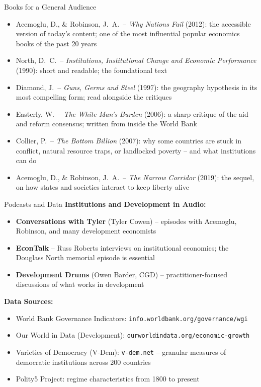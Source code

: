 \documentclass[10pt]{beamer}
\begin{document}
\begin{frame}{Books for a General Audience}
\begin{itemize}
\item Acemoglu, D., \& Robinson, J.\ A.\ -- \emph{Why Nations Fail} (2012): the accessible version of today's content; one of the most influential popular economics books of the past 20 years
\item North, D.\ C.\ -- \emph{Institutions, Institutional Change and Economic Performance} (1990): short and readable; the foundational text
\item Diamond, J.\ -- \emph{Guns, Germs and Steel} (1997): the geography hypothesis in its most compelling form; read alongside the critiques
\item Easterly, W.\ -- \emph{The White Man's Burden} (2006): a sharp critique of the aid and reform consensus; written from inside the World Bank
\item Collier, P.\ -- \emph{The Bottom Billion} (2007): why some countries are stuck in conflict, natural resource traps, or landlocked poverty -- and what institutions can do
\item Acemoglu, D., \& Robinson, J.\ A.\ -- \emph{The Narrow Corridor} (2019): the sequel, on how states and societies interact to keep liberty alive
\end{itemize}
\end{frame}


\begin{frame}[allowframebreaks]{Podcasts and Data}
\textbf{Institutions and Development in Audio:}
\begin{itemize}
\item \textbf{Conversations with Tyler} (Tyler Cowen) -- episodes with Acemoglu, Robinson, and many development economists
\item \textbf{EconTalk} -- Russ Roberts interviews on institutional economics; the Douglass North memorial episode is essential
\item \textbf{Development Drums} (Owen Barder, CGD) -- practitioner-focused discussions of what works in development
\end{itemize}


\textbf{Data Sources:}
\begin{itemize}
\item World Bank Governance Indicators: \texttt{info.worldbank.org/governance/wgi}
\item Our World in Data (Development): \texttt{ourworldindata.org/economic-growth}
\item Varieties of Democracy (V-Dem): \texttt{v-dem.net} -- granular measures of democratic institutions across 200 countries
\item Polity5 Project: regime characteristics from 1800 to present
\end{itemize}
\end{frame}
\end{document}
